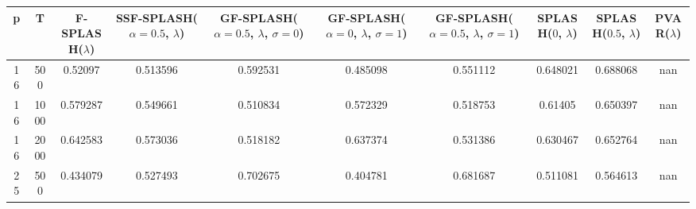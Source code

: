\begin{tabular}{cccccccccc}
\hline
  p  &  T   &  F-SPLASH($\lambda$)  &  SSF-SPLASH($\alpha=0.5$, $\lambda$)  &  GF-SPLASH($\alpha=0.5$, $\lambda$, $\sigma=0$)  &  GF-SPLASH($\alpha=0$, $\lambda$, $\sigma=1$)  &  GF-SPLASH($\alpha=0.5$, $\lambda$, $\sigma=1$)  &  SPLASH($0$, $\lambda$)  &  SPLASH($0.5$, $\lambda$)  &  PVAR($\lambda$)  \\
\hline
 16  & 500  &        0.52097        &               0.513596                &                     0.592531                     &                    0.485098                    &                     0.551112                     &         0.648021         &          0.688068          &        nan        \\
 16  & 1000 &       0.579287        &               0.549661                &                     0.510834                     &                    0.572329                    &                     0.518753                     &         0.61405          &          0.650397          &        nan        \\
 16  & 2000 &       0.642583        &               0.573036                &                     0.518182                     &                    0.637374                    &                     0.531386                     &         0.630467         &          0.652764          &        nan        \\
 25  & 500  &       0.434079        &               0.527493                &                     0.702675                     &                    0.404781                    &                     0.681687                     &         0.511081         &          0.564613          &        nan        \\
\hline
\end{tabular}